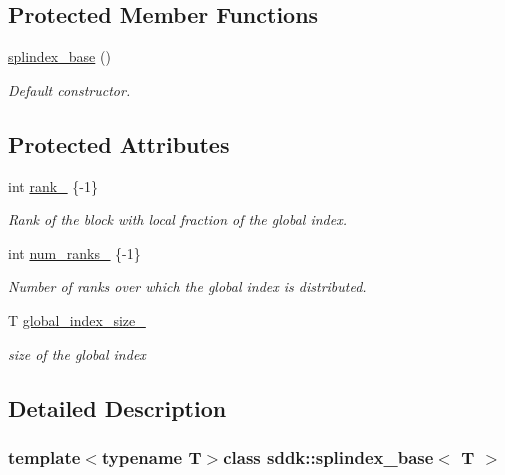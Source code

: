 \subsection*{Protected Member Functions}
\begin{DoxyCompactItemize}
\item 
\hyperlink{classsddk_1_1splindex__base_a3391f02acb0022c9e55f6f4bd41321e0}{splindex\+\_\+base} ()
\begin{DoxyCompactList}\small\item\em Default constructor. \end{DoxyCompactList}\end{DoxyCompactItemize}
\subsection*{Protected Attributes}
\begin{DoxyCompactItemize}
\item 
int \hyperlink{classsddk_1_1splindex__base_a45e276f586192f4e0ec227ea87d02885}{rank\+\_\+} \{-\/1\}
\begin{DoxyCompactList}\small\item\em Rank of the block with local fraction of the global index. \end{DoxyCompactList}\item 
int \hyperlink{classsddk_1_1splindex__base_a51bad9a1920fcca16c5fa6d4b27a315d}{num\+\_\+ranks\+\_\+} \{-\/1\}
\begin{DoxyCompactList}\small\item\em Number of ranks over which the global index is distributed. \end{DoxyCompactList}\item 
T \hyperlink{classsddk_1_1splindex__base_a39cf25f14bf77e1bbde2d3eedb729868}{global\+\_\+index\+\_\+size\+\_\+}
\begin{DoxyCompactList}\small\item\em size of the global index \end{DoxyCompactList}\end{DoxyCompactItemize}


\subsection{Detailed Description}
\subsubsection*{template$<$typename T$>$class sddk\+::splindex\+\_\+base$<$ T $>$}

